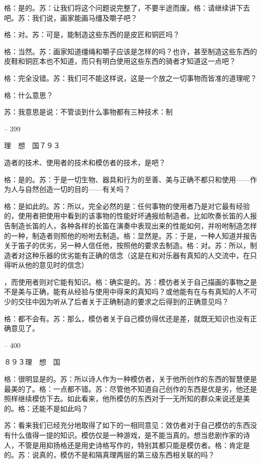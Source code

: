\documentclass[11pt,oneside]{book}
\begin{document}
\begin{common-format}
    格：是的。苏：让我们将这个问题说完整了，不要半途而废。格：请继续讲下去吧。苏：我们说，画家能画马缰及嚼子吧？

    格：对。苏：可是，能制造这些东西的是皮匠和铜匠吗？

    格：当然。苏：画家知道缰绳和嚼子应该是怎样的吗？也许，甚至制造这些东西的皮鞋和铜匠本也不知道，而只有明白使用这些东西的骑者才知道这一点吧？

    格：完全没错。苏：我们可不能这样说，这是一个放之一切事物而皆准的道理呢？

    格：什么意思？

    苏：我意思是说：不管谈到什么事物都有三种技术：制

    

-- 399

    理　想　国７９３

    造者的技术、使用者的技术和模仿者的技术，是吧？

    格：是的。苏：于是一切生物、器具和行为的至善、美与正确不都只和使用——作为人与自然创造一切的目的——有关吗？

    格：是如此的。苏：所以，完全必然的是：任何事物的使用者乃是对它最有经验的，使用者把使用中看到的该事物的性能好坏通报给制造者。比如吹奏长笛的人报告制造长笛的人，各种各样的长笛在演奏中表现出来的性能如何，并吩咐制造怎样的一种，制造者则照他的吩咐去制造。格：显然是。苏：于是，一种人知道并报告关于笛子的优劣，另一种人信任他，按照他的要求去制造。格：对。苏：所以，制造者对这种乐器的优劣能有正确的信念（这是在和对乐器有真知的人交流中，在只得听从他的意见时的信念）

    ，而使用者则对它能有知识。格：确实是的。苏：模仿者关于自己描画的事物之是不是美与正确，能有从经验与使用中得来的真知吗？或他能有在与有真知的人不可少的交往中因为听从了后者关于正确制造的要求之后得到的正确意见吗？

    格：都不会有。苏：那么，模仿者关于自己模仿得优还是差，就既无知识也没有正确意见了。

    

-- 400

    ８９３理　想　国

    格：很明显是的。苏：所以诗人作为一种模仿者，关于他所创作的东西的智慧便是最美的了。格：一点都不错。苏：尽管他不知道自己创作的东西是优是劣，他还是照样继续模仿下去。如此看来，他所模仿的东西对于一无所知的群众来说还是美的。格：还能不是如此吗？

    苏：看来我们已经充分地取得了如下的一相同意见：效仿者对于自己模仿的东西没有什么值得一提的知识。模仿仅是一种游戏，是不能当真的。想当悲剧作家的诗人，不管是用抑扬格还是用史诗格写作的，特别其都只能是模仿者。格：肯定是的。苏：说真的，模仿不是和隔真理两层的第三级东西相关联的吗？


\end{common-format}
\end{document}
